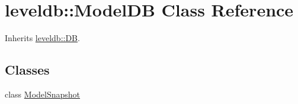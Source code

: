 \hypertarget{classleveldb_1_1_model_d_b}{}\section{leveldb\+::Model\+DB Class Reference}
\label{classleveldb_1_1_model_d_b}


Inherits \mbox{\hyperlink{classleveldb_1_1_d_b}{leveldb\+::\+DB}}.

\subsection*{Classes}
\begin{DoxyCompactItemize}
\item 
class \mbox{\hyperlink{classleveldb_1_1_model_d_b_1_1_model_snapshot}{Model\+Snapshot}}
\end{DoxyCompactItemize}

